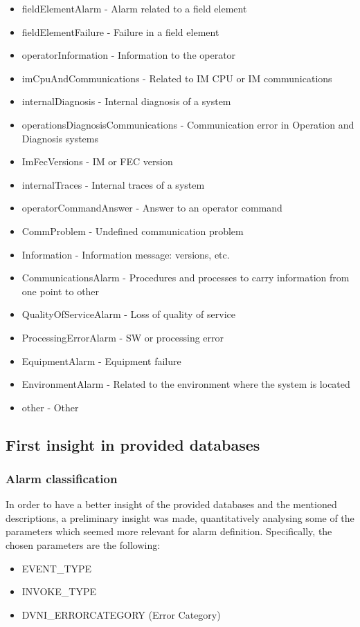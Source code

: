 \documentclass[a4paper,10pt]{book}
\begin{document}
\begin{itemize}
  \item fieldElementAlarm - Alarm related to a field element
  \item fieldElementFailure - Failure in a field element
  \item operatorInformation - Information to the operator
  \item imCpuAndCommunications - Related to IM CPU or IM communications
  \item internalDiagnosis - Internal diagnosis of a system
  \item operationsDiagnosisCommunications - Communication error in Operation and Diagnosis systems
  \item ImFecVersions - IM or FEC version
  \item internalTraces - Internal traces of a system
  \item operatorCommandAnswer - Answer to an operator command
  \item CommProblem - Undefined communication problem
  \item Information - Information message: versions, etc.
  \item CommunicationsAlarm - Procedures and processes to carry information from one point to other
  \item QualityOfServiceAlarm - Loss of quality of service
  \item ProcessingErrorAlarm - SW or processing error
  \item EquipmentAlarm - Equipment failure
  \item EnvironmentAlarm - Related to the environment where the system is located
  \item other - Other
\end{itemize}

\subsection{First insight in provided databases}
\subsubsection{Alarm classification}
In order to have a better insight of the provided databases and the mentioned descriptions, a preliminary insight was made, quantitatively analysing some of the parameters which seemed more relevant for alarm definition. Specifically, the chosen parameters are the following:

\begin{itemize}
 \item EVENT\_TYPE
 \item INVOKE\_TYPE
 \item DVNI\_ERRORCATEGORY (Error Category)
\end{itemize}
\end{document}
